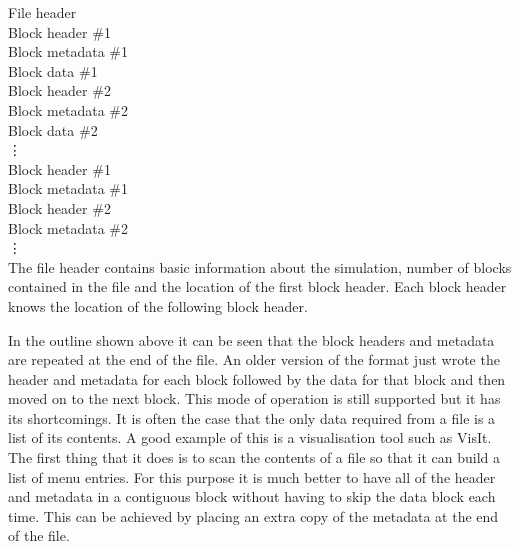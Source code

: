 \documentclass[12pt]{article}
\begin{document}
\noindent
\hspace*{10mm}File header\\
\hspace*{15mm}Block header \#1\\
\hspace*{20mm}Block metadata \#1\\
\hspace*{25mm}Block data \#1\\
\hspace*{15mm}Block header \#2\\
\hspace*{20mm}Block metadata \#2\\
\hspace*{25mm}Block data \#2\\
\hspace*{25mm}\vdots\\
\hspace*{15mm}Block header \#1\\
\hspace*{20mm}Block metadata \#1\\
\hspace*{15mm}Block header \#2\\
\hspace*{20mm}Block metadata \#2\\
\hspace*{25mm}\vdots\\

The file header contains basic information about the simulation, number
of blocks contained in the file and the location of the first block header.
Each block header knows the location of the following block header.

In the outline shown above it can be seen that the block headers and metadata
are repeated at the end of the file. An older version of the format just
wrote the header and metadata for each block followed by the data for
that block and then moved on to the next block. This mode of operation is
still supported but it has its shortcomings. It is often the case that
the only data required from a file is a list of its contents. A good example
of this is a visualisation tool such as VisIt. The first thing that it
does is to scan the contents of a file so that it can build a list of menu
entries. For this purpose it is much better to have all of the header and
metadata in a contiguous block without having to skip the data block each
time. This can be achieved by placing an extra copy of the metadata at
the end of the file.
\end{document}
